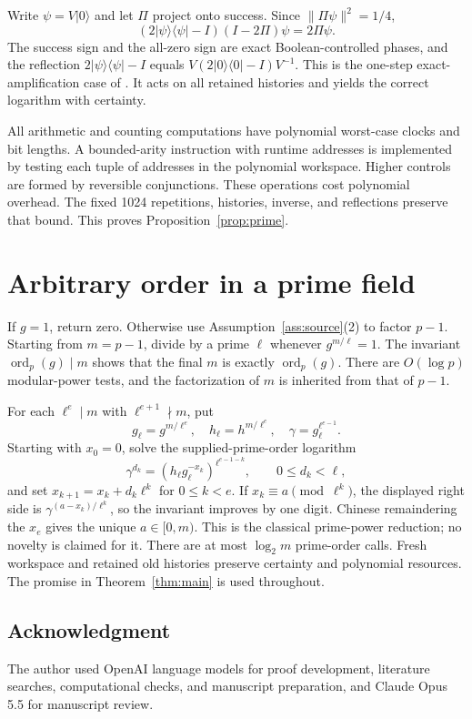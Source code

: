 \documentclass[11pt,reqno]{amsart}
\numberwithin{equation}{section}
\theoremstyle{definition}
\theoremstyle{remark}
\newcommand{\ket}[1]{\lvert#1\rangle}
\newcommand{\bra}[1]{\langle#1\rvert}
\DeclareMathOperator{\ord}{ord}
\begin{document}
Write $\psi=V\ket0$ and let $\Pi$ project onto success. Since
$\|\Pi\psi\|^2=1/4$,
\[
 (2\ket\psi\bra\psi-I)(I-2\Pi)\psi=2\Pi\psi.
\]
The success sign and the all-zero sign are exact Boolean-controlled
phases, and the reflection $2\ket\psi\bra\psi-I$ equals
$V(2\ket0\bra0-I)V^{-1}$. This is the one-step exact-amplification
case of \cite{BHMT}. It acts on all retained histories and yields the
correct logarithm with certainty.

All arithmetic and counting computations have polynomial worst-case
clocks and bit lengths. A bounded-arity instruction with runtime
addresses is implemented by testing each tuple of addresses in the
polynomial workspace. Higher controls are formed by reversible
conjunctions. These operations cost polynomial overhead. The fixed
1024 repetitions, histories, inverse, and reflections preserve that
bound. This proves Proposition~\ref{prop:prime}.

\section{Arbitrary order in a prime field}
If $g=1$, return zero. Otherwise use Assumption~\ref{ass:source}(2) to
factor $p-1$. Starting from $m=p-1$, divide by a prime $\ell$ whenever
$g^{m/\ell}=1$. The invariant $\ord_p(g)\mid m$ shows that the final
$m$ is exactly $\ord_p(g)$. There are $O(\log p)$ modular-power tests,
and the factorization of $m$ is inherited from that of $p-1$.

For each $\ell^e\mid m$ with $\ell^{e+1}\nmid m$, put
\[
 g_\ell=g^{m/\ell^e},\quad h_\ell=h^{m/\ell^e},\quad
 \gamma=g_\ell^{\ell^{e-1}}.
\]
Starting with $x_0=0$, solve the supplied-prime-order logarithm
\[
 \gamma^{d_k}=(h_\ell g_\ell^{-x_k})^{\ell^{e-1-k}},
 \qquad 0\le d_k<\ell,
\]
and set $x_{k+1}=x_k+d_k\ell^k$ for $0\le k<e$.
If $x_k\equiv a\pmod{\ell^k}$, the displayed right side is
$\gamma^{(a-x_k)/\ell^k}$, so the invariant improves by one digit.
Chinese remaindering the $x_e$ gives the unique $a\in[0,m)$.
This is the classical prime-power reduction; no novelty is claimed for
it. There are at most $\log_2m$ prime-order calls. Fresh workspace and
retained old histories preserve certainty and polynomial resources.
The promise in Theorem~\ref{thm:main} is used throughout.

\subsection*{Acknowledgment}
The author used OpenAI language models for proof development, literature
searches, computational checks, and manuscript preparation, and Claude
Opus 5.5 for manuscript review.
\end{document}
